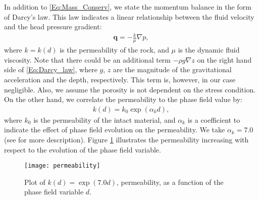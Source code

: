 In addition to \eqref{Eq:Mass_Conserv}, we state the momentum balance in the form of Darcy's law. This law indicates a linear relationship between the fluid velocity and the head pressure gradient:
\begin{equation}\label{Eq:Darcy_law}
    \begin{aligned}
        \bm{q} = -\frac{k}{\mu} \nabla p,
    \end{aligned}
\end{equation}
where $k=k(d)$ is the permeability of the rock, and $\mu$ is the dynamic fluid viscosity. %
Note that there could be an additional term $- \rho g\nabla z$  {on the right hand side of} \eqref{Eq:Darcy_law}, where $g$, $z$ are the magnitude of the gravitational acceleration and the depth, respectively. This term is, however, in our case negligible.
Also, we assume the porosity is not dependent on the stress condition. On the other hand, we correlate the permeability to the phase field value by:
\begin{equation}\label{Eq:k_0}
    \begin{aligned}
        k(d) = k_0\exp{\left({\alpha}_k d\right)},
    \end{aligned}
\end{equation}
where $k_0$ is the permeability of the intact material, and ${\alpha}_k$ is a coefficient to indicate the effect of phase field evolution on the permeability. We take ${\alpha}_k=7.0$ (see \cite{PILLAI201836, ZHU2013179} for more description). Figure \ref{Fig:Permeability_increments} illustrates the permeability increasing with respect to the evolution of the phase field variable.


\begin{figure}[htbp]
    \centering
    \texttt{[image: permeability]}
    \caption{Plot of $k(d)=\exp(7.0 d)$, permeability, as a function of the phase field variable $d$.}
    \label{Fig:Permeability_increments}
\end{figure}

